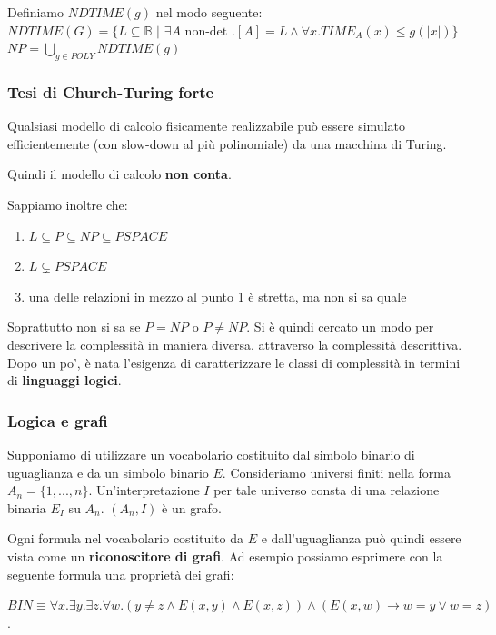\documentclass{article}
\begin{document}
\bigskip

Definiamo $NDTIME(g)$ nel modo seguente:
\\
$NDTIME(G)=\{L\subseteq\mathbb{B}\,\,|\,\,\exists A\text{ non-det }.[A]=L\land\forall x.TIME_A(x)\leq g(|x|)\}$
\\
$NP=\bigcup_{g\in POLY} NDTIME(g)$

\subsubsection{Tesi di Church-Turing forte}
Qualsiasi modello di calcolo fisicamente realizzabile può essere simulato efficientemente (con slow-down al più polinomiale) da una macchina di Turing.

\bigskip

Quindi il modello di calcolo \textbf{non conta}.

\bigskip

Sappiamo inoltre che:
\begin{enumerate}
    \item $L\subseteq P\subseteq NP\subseteq PSPACE$
    \item $L\subsetneq PSPACE$
    \item una delle relazioni in mezzo al punto 1 è stretta, ma non si sa quale 
\end{enumerate}
Soprattutto non si sa se $P=NP$ o $P\neq NP$. Si è quindi cercato un modo per descrivere la complessità in maniera diversa, attraverso la complessità descrittiva. Dopo un po', è nata l'esigenza di caratterizzare le classi di complessità in termini di \textbf{linguaggi logici}.

\subsubsection{Logica e grafi}
Supponiamo di utilizzare un vocabolario costituito dal simbolo binario di uguaglianza e da un simbolo binario $E$.
Consideriamo universi finiti nella forma $A_n=\{1,...,n\}$. Un'interpretazione $I$ per tale universo consta di una relazione binaria $E_I$ su $A_n$. $(A_n,I)$ è un grafo.

\bigskip

Ogni formula nel vocabolario costituito da $E$ e dall'uguaglianza può quindi essere vista come un \textbf{riconoscitore di grafi}. Ad esempio possiamo esprimere con la seguente formula una proprietà dei grafi:

\bigskip

$BIN\equiv\forall x.\exists y.\exists z.\forall w.(y\neq z\land E(x,y)\land E(x,z)) \land (E(x,w)\to w=y\lor w=z)$.
\end{document}
